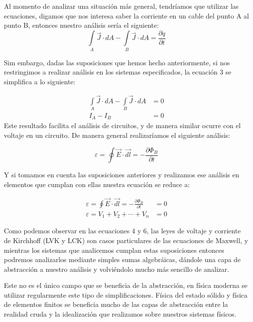 \documentclass[12pt, letterpaper]{article}
\begin{document}
Al momento de analizar una situación más general, tendríamos que utilizar las ecuaciones, digamos que nos interesa saber la corriente en un cable del punto A al punto B, entonces nuestro análisis sería el siguiente:
\begin{equation}
	\int\limits_A \vec{J} \cdot dA - \int\limits_B \vec{J} \cdot dA = \frac{\partial q}{\partial t}
\end{equation}

Sim embargo, dadas las suposiciones que hemos hecho anteriormente, si nos restringimos a realizar análisis en los sistemas especificados, la ecuación 3 se simplifica a lo siguiente:

\begin{equation}
	\begin{split}
		\int\limits_A \vec{J} \cdot dA - \int\limits_B \vec{J} \cdot dA &= 0\\
		I_A - I_B &= 0
	\end{split}
\end{equation}
 Este resultado facilita el análisis de circuitos, y de manera similar ocurre con el voltaje en un circuito. De manera general realizaríamos el siguiente análisis:

 \begin{equation}
	 \varepsilon = \oint \vec{E} \cdot \vec{dl} = -\frac{\partial \Phi_B}{\partial t}
 \end{equation}

 Y si tomamos en cuenta las suposiciones anteriores y realizamos ese análisis en elementos que cumplan con ellas nuestra ecuación se reduce a:

 \begin{equation}
	 \begin{split}
		 \varepsilon = \oint \vec{E} \cdot \vec{dl} = - \frac{\partial \Phi_B}{\partial t} &= 0\\
		 \varepsilon = V_1 + V_2 + \cdots + V_n &= 0
	\end{split} 
\end{equation}

Como podemos observar en las ecuaciones 4 y 6, las leyes de voltaje y corriente de Kirchhoff (LVK y LCK) son casos particulares de las ecuaciones de Maxwell, y mientras los sistemas que analicemos cumplan estas suposiciones entonces podremos analizarlos mediante simples sumas algebráicas, dándole una capa de abstracción a nuestro análisis y volviéndolo mucho más sencillo de analizar.

Este no es el único campo que se beneficia de la abstracción, en física moderna se utilizar regularmente este tipo de simplificaciones. Física del estado sólido y física de elementos finitos se beneficia mucho de las capas de abstracción entre la realidad cruda y la idealización que realizamos sobre nuestros sistemas físicos.
\end{document}
